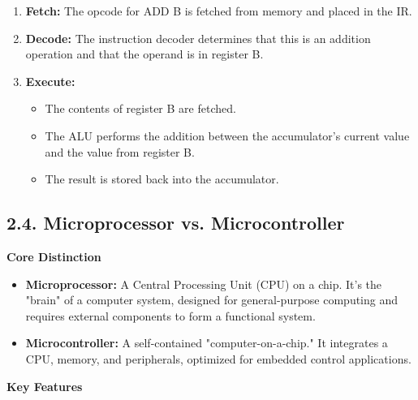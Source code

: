 \documentclass[
]{article}
\begin{document}
\begin{enumerate}
\def\labelenumi{\arabic{enumi}.}
\item
  \textbf{Fetch:} The opcode for ADD B is fetched from memory and placed
  in the IR.
\item
  \textbf{Decode:} The instruction decoder determines that this is an
  addition operation and that the operand is in register B.
\item
  \textbf{Execute:}

  \begin{itemize}
  \item
    The contents of register B are fetched.
  \item
    The ALU performs the addition between the accumulator's current
    value and the value from register B.
  \item
    The result is stored back into the accumulator.
  \end{itemize}
\end{enumerate}

\hypertarget{24-microprocessor-vs-microcontroller}{%
\subsection{2.4. Microprocessor vs.
Microcontroller}\label{24-microprocessor-vs-microcontroller}}

\textbf{Core Distinction}

\begin{itemize}
\item
  \textbf{Microprocessor:} A Central Processing Unit (CPU) on a chip.
  It's the "brain" of a computer system, designed for general-purpose
  computing and requires external components to form a functional
  system.
\item
  \textbf{Microcontroller:} A self-contained "computer-on-a-chip." It
  integrates a CPU, memory, and peripherals, optimized for embedded
  control applications.
\end{itemize}

\textbf{Key Features}
\end{document}
